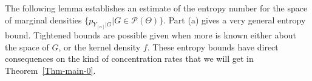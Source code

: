 \documentclass[MSNbibl,number,citesort]{arxbj}
\def\comment{}
\newcommand{\Pcal}{\mathscr{P}}
\newcommand{\Wr}{W_r}
\begin{document}
%
%

The following lemma establishes
an estimate of the entropy number for the space of marginal
densities $\{{p_{Y_{[n]}|G}}| G\in\Pcal(\Theta)\}$. Part
(a) gives a very
general entropy bound. Tightened bounds are possible given
when more is known either about the space of $G$, or the
kernel density $f$. These entropy bounds have direct
consequences on the kind of concentration rates that we will get
in Theorem~\ref{Thm-main-0}.
\end{document}
